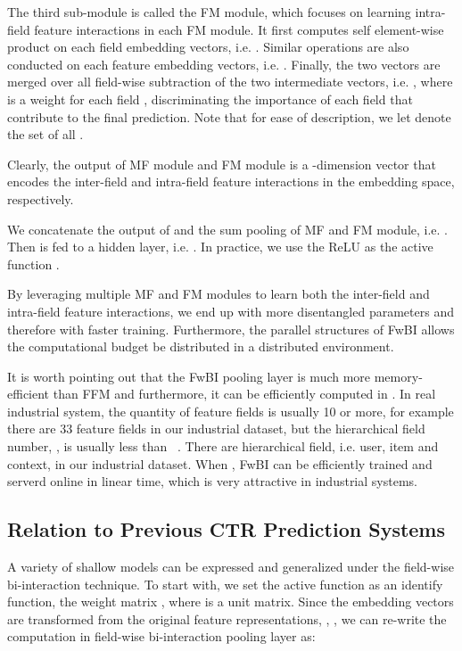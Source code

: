 \documentclass[sigconf]{acmart}
\begin{document}
The third sub-module is called the FM module, which focuses on learning intra-field feature interactions in each FM module. It first computes self element-wise product on each field embedding vectors, i.e. . 
Similar operations are also conducted on each feature embedding vectors,  i.e. . 
Finally, the two vectors are merged over all field-wise subtraction of the two intermediate vectors, i.e. , where  is a weight for each field , discriminating the importance of each field that contribute to the final prediction. Note that for ease of description, we let  denote the set of all .

Clearly, the output of MF module and FM module is a -dimension vector that encodes the inter-field and intra-field feature interactions in the embedding space, respectively.

We concatenate the output of  and the sum pooling of MF and FM module, i.e. . 
Then  is fed to a hidden layer,  i.e. . 
In practice, we use the ReLU as the active function . 

By leveraging multiple MF and FM modules to learn both the inter-field and intra-field feature interactions, we end up with more disentangled parameters and therefore with faster training. Furthermore, the parallel structures of FwBI allows the computational budget be distributed in a distributed environment. 

It is worth pointing out that the FwBI pooling layer is much more memory-efficient than FFM and furthermore, it can be efficiently computed in . In real industrial system, the quantity of feature fields is usually 10 or more, for example there are 33 feature fields in our industrial dataset, but the hierarchical field number, , is usually less than ~\citep{liu2017pbodl,covington2016deep}. There are  hierarchical field, i.e. user, item and context, in our industrial dataset. When , FwBI can be efficiently trained and serverd online in linear time, which is very attractive in industrial systems.


\subsection{Relation to Previous CTR Prediction Systems}
A variety of shallow models can be expressed and generalized under the field-wise bi-interaction technique. 
To start with, we set the active function  as an identify function, the weight matrix , where  is a unit matrix. 
Since the embedding vectors  are transformed from the original feature representations, , , we can re-write the computation in field-wise bi-interaction pooling layer as: 
   
\end{document}

